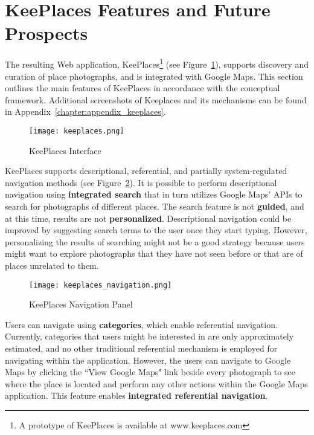 {\section{KeePlaces Features and Future Prospects}
The resulting Web application, KeePlaces\footnote[1]{A prototype of KeePlaces is available at www.keeplaces.com} (see Figure~\ref{fig:keeplaces}), supports discovery and curation of place photographs, and is integrated with Google Maps. This section outlines the main features of KeePlaces in accordance with the conceptual framework. Additional screenshots of Keeplaces and its mechanisms can be found in Appendix~\ref{chapter:appendix_keeplaces}. 


\begin{figure}[ht!]
	\noindent
	\centering
	\texttt{[image: keeplaces.png]}
	\caption{KeePlaces Interface}
	\label{fig:keeplaces} 
\end{figure}

KeePlaces supports descriptional, referential, and partially system-regulated navigation methods (see Figure~\ref{fig:keeplaces_nav}). It is possible to perform descriptional navigation using \textbf{integrated search} that in turn utilizes Google Maps' APIs to search for photographs of different places. The search feature is not \textbf{guided}, and at this time, results are not \textbf{personalized}. Descriptional navigation could be improved by suggesting search terms to the user once they start typing. However, personalizing the results of searching might not be a good strategy because users might want to explore photographs that they have not seen before or that are of places unrelated to them. 

\begin{figure}[ht!]
	\noindent
	\centering
	\texttt{[image: keeplaces\_navigation.png]}
	\caption{KeePlaces Navigation Panel}
	\label{fig:keeplaces_nav} 
\end{figure}

Users can navigate using \textbf{categories}, which enable referential navigation. Currently, categories that users might be interested in are only approximately estimated, and no other traditional referential mechanism is employed for navigating within the application. However, the users can navigate to Google Maps by clicking the ``View Google Maps" link beside every photograph to see where the place is located and perform any other actions within the Google Maps application. This feature enables \textbf{integrated referential navigation}. 

}
